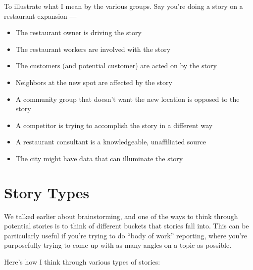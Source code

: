 \documentclass[
  12pt,
  american,
  letterpaperpaper,
  extrafontsizes,onecolumn,openright
  ]{memoir}
\providecommand{\tightlist}{%
  \setlength{\itemsep}{0pt}\setlength{\parskip}{0pt}}
\begin{document}
To illustrate what I mean by the various groups. Say you're doing a story on a restaurant expansion ---

\begin{itemize}
\tightlist
\item
  The restaurant owner is driving the story
\item
  The restaurant workers are involved with the story
\item
  The customers (and potential customer) are acted on by the story
\item
  Neighbors at the new spot are affected by the story
\item
  A community group that doesn't want the new location is opposed to the story
\item
  A competitor is trying to accomplish the story in a different way
\item
  A restaurant consultant is a knowledgeable, unaffiliated source
\item
  The city might have data that can illuminate the story
\end{itemize}

\hypertarget{story-types}{%
\chapter{Story Types}\label{story-types}}

We talked earlier about brainstorming, and one of the ways to think through potential stories is to think of different buckets that stories fall into. This can be particularly useful if you're trying to do \enquote{body of work} reporting, where you're purposefully trying to come up with as many angles on a topic as possible.

Here's how I think through various types of stories:
\end{document}
